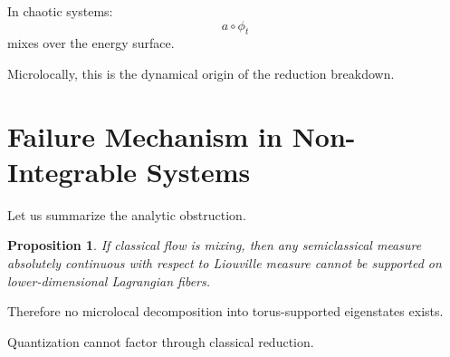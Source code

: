 \documentclass[11pt]{article}
\newtheorem{proposition}[theorem]{Proposition}
\begin{document}
In chaotic systems:
\[
a \circ \phi_t
\]
mixes over the energy surface.

Microlocally, this is the dynamical origin of the reduction breakdown.

\section{Failure Mechanism in Non-Integrable Systems}

Let us summarize the analytic obstruction.

\begin{proposition}
If classical flow is mixing, then any semiclassical measure
absolutely continuous with respect to Liouville measure
cannot be supported on lower-dimensional Lagrangian fibers.
\end{proposition}

Therefore no microlocal decomposition into torus-supported
eigenstates exists.

Quantization cannot factor through classical reduction.
\end{document}
